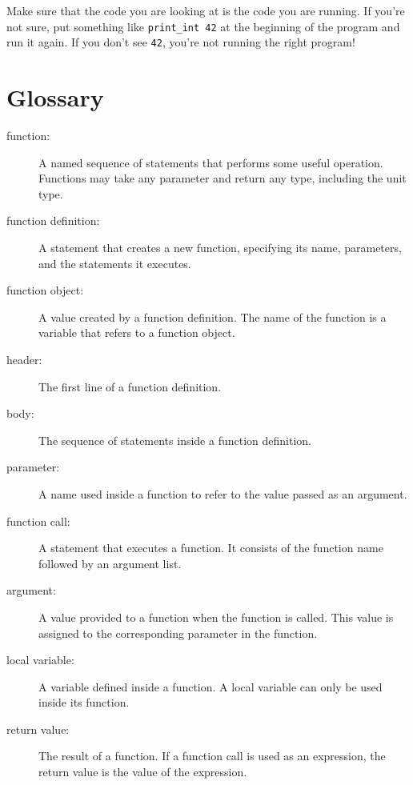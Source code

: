 \documentclass[10pt]{book}
\begin{document}
Make sure that the code you are looking at is the code you are running.
If you're not sure, put something like {\tt print\_int 42} at the
beginning of the program and run it again.  If you don't see
{\tt 42}, you're not running the right program!


\section{Glossary}

\begin{description}

\item[function:] A named sequence of statements that performs some
useful operation.  Functions may take any parameter and return any 
type, including the unit type.

\item[function definition:]  A statement that creates a new function,
specifying its name, parameters, and the statements it executes.

\item[function object:]  A value created by a function definition.
The name of the function is a variable that refers to a function
object.

\item[header:] The first line of a function definition.

\item[body:] The sequence of statements inside a function definition.

\item[parameter:] A name used inside a function to refer to the value
passed as an argument.

\item[function call:] A statement that executes a function. It
consists of the function name followed by an argument list.

\item[argument:]  A value provided to a function when the function is called.
This value is assigned to the corresponding parameter in the function.

\item[local variable:]  A variable defined inside a function.  A local
variable can only be used inside its function.

\item[return value:]  The result of a function.  If a function call
is used as an expression, the return value is the value of
the expression.


\end{description}
\end{document}
